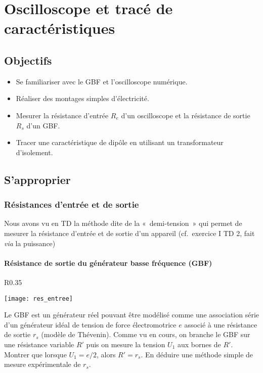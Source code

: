 \documentclass[a4paper, 11pt, final, garamond]{book}
\begin{document}
\setcounter{chapter}{4}

\chapter{Oscilloscope et trac\'e de caract\'eristiques}
\section{Objectifs}

\begin{itemize}
    \item Se familiariser avec le GBF et l'oscilloscope numérique.
    \item Réaliser des montages simples d'électricité.
    \item Mesurer la résistance d'entrée $R_{e}$ d'un oscilloscope et la
        résistance de sortie $R_{s}$ d'un GBF.
    \item Tracer une caractéristique de dipôle en utilisant un transformateur
        d'isolement.
\end{itemize}

\section{S'approprier}

\subsection{Résistances d'entrée et de sortie}

Nous avons vu en TD la méthode dite de la «~demi-tension~» qui permet de mesurer
la résistance d'entrée et de sortie d'un appareil (cf.\ exercice I TD 2, fait
\textit{via} la puissance)

\subsubsection{Résistance de sortie du générateur basse fréquence (GBF)}

\begin{wrapfigure}[6]{R}{0.35\textwidth}
\vspace{-35pt}
  \begin{center}
    \texttt{[image: res\_entree]}
  \end{center}
\end{wrapfigure}

Le GBF est un générateur réel pouvant être modélisé comme une association série
d'un générateur idéal de tension de force électromotrice $e$ associé à une
résistance de sortie $r_{s}$ (modèle de Thévenin). Comme vu en cours, on branche
le GBF sur une résistance variable $R'$ puis on mesure la tension $U_1$ aux
bornes de $R'$. Montrer que lorsque $U_1 = e/2$, alors $R' = r_{s}$. En déduire
une méthode simple de mesure expérimentale de $r_{s}$.
\end{document}
